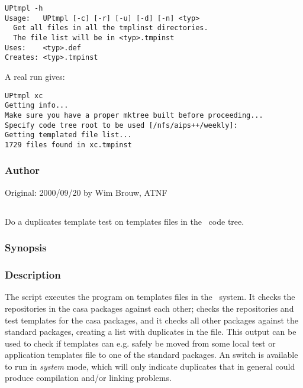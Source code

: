 \begin{verbatim}
UPtmpl -h
Usage:   UPtmpl [-c] [-r] [-u] [-d] [-n] <typ>
  Get all files in all the tmplinst directories.
  The file list will be in <typ>.tmpinst
Uses:    <typ>.def
Creates: <typ>.tmpinst
\end{verbatim}

\noindent
A real run gives:

\begin{verbatim}
UPtmpl xc
Getting info...
Make sure you have a proper mktree built before proceeding...
Specify code tree root to be used [/nfs/aips++/weekly]: 
Getting templated file list...
1729 files found in xc.tmpinst
\end{verbatim}

\subsubsection*{Author}

Original: 2000/09/20 by Wim Brouw, ATNF


\newpage

\subsection{}
\label{UPdup}

Do a duplicates template test on templates files in the \aipspp\ code tree.

\subsubsection*{Synopsis}

\begin{synopsis}
\end{synopsis}

\subsubsection*{Description}

\noindent
The  script executes the  program on templates
files in the \aipspp\ system. It checks the repositories in the casa
packages against each other; checks the repositories and test
templates for the casa packages, and it checks all other packages
against the standard  packages, creating a list with
duplicates in the  file.
This output can be used to check if templates can
e.g. safely be moved from some local test or application templates file to
one of the standard  packages. An  switch is
available to run in {\em system} mode, which will only indicate duplicates
that in general could produce compilation and/or linking problems. \\


